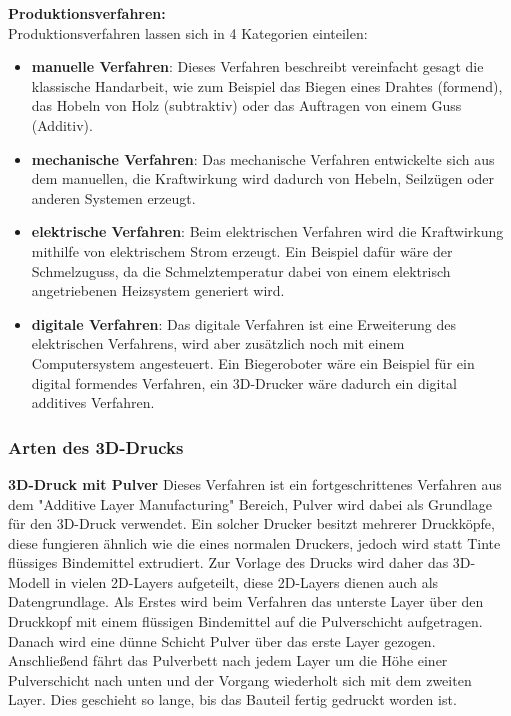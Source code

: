 \textbf{Produktionsverfahren:}\\
 Produktionsverfahren lassen sich in 4 Kategorien einteilen:
\begin{itemize}
    \item \textbf{manuelle Verfahren}: Dieses Verfahren beschreibt vereinfacht gesagt die klassische  Handarbeit, wie zum Beispiel das Biegen eines Drahtes (formend), das Hobeln von Holz (subtraktiv) oder das Auftragen von einem Guss (Additiv).
    \item \textbf{mechanische Verfahren}: Das mechanische Verfahren entwickelte sich aus dem manuellen, die Kraftwirkung wird dadurch von Hebeln, Seilzügen oder anderen Systemen erzeugt.
    \item \textbf{elektrische Verfahren}: Beim elektrischen Verfahren wird die Kraftwirkung mithilfe von elektrischem Strom erzeugt. Ein Beispiel dafür wäre der Schmelzuguss, da die Schmelztemperatur dabei von einem elektrisch angetriebenen Heizsystem generiert wird.
    \item \textbf{digitale Verfahren}: Das digitale Verfahren ist eine Erweiterung des elektrischen Verfahrens, wird aber zusätzlich noch mit einem Computersystem angesteuert. Ein Biegeroboter wäre ein Beispiel für ein digital formendes Verfahren, ein 3D-Drucker wäre dadurch ein digital additives Verfahren.
\end{itemize}

\subsubsection{Arten des 3D-Drucks}
\textbf{3D-Druck mit Pulver}
Dieses Verfahren ist ein fortgeschrittenes Verfahren aus dem "Additive Layer Manufacturing" Bereich, Pulver wird dabei
als Grundlage für den 3D-Druck verwendet. Ein solcher Drucker besitzt mehrerer Druckköpfe, diese fungieren ähnlich wie
die eines normalen Druckers, jedoch wird statt Tinte flüssiges Bindemittel extrudiert. Zur Vorlage des Drucks wird daher das
3D-Modell in vielen 2D-Layers aufgeteilt, diese 2D-Layers dienen auch als Datengrundlage.
Als Erstes wird beim Verfahren das unterste Layer über den Druckkopf mit einem flüssigen Bindemittel auf die Pulverschicht
aufgetragen. Danach wird eine dünne Schicht Pulver über das erste Layer gezogen. Anschließend fährt
das Pulverbett nach jedem Layer um die Höhe einer Pulverschicht nach unten und der Vorgang wiederholt sich mit dem
zweiten Layer. Dies geschieht so lange, bis das Bauteil fertig gedruckt worden ist.\\

